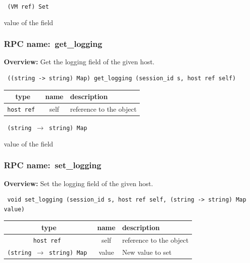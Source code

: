 \vspace{0.3cm}

{\tt 
(VM ref) Set
}


value of the field
\vspace{0.3cm}
\vspace{0.3cm}
\vspace{0.3cm}
\subsubsection{RPC name:~get\_logging}

{\bf Overview:} 
Get the logging field of the given host.

\begin{verbatim} ((string -> string) Map) get_logging (session_id s, host ref self)\end{verbatim}



 
\vspace{0.3cm}
\begin{tabular}{|c|c|p{7cm}|}
 \hline
{\bf type} & {\bf name} & {\bf description} \\ \hline
{\tt host ref } & self & reference to the object \\ \hline 

\end{tabular}

\vspace{0.3cm}

{\tt 
(string $\rightarrow$ string) Map
}


value of the field
\vspace{0.3cm}
\vspace{0.3cm}
\vspace{0.3cm}
\subsubsection{RPC name:~set\_logging}

{\bf Overview:} 
Set the logging field of the given host.

\begin{verbatim} void set_logging (session_id s, host ref self, (string -> string) Map value)\end{verbatim}



 
\vspace{0.3cm}
\begin{tabular}{|c|c|p{7cm}|}
 \hline
{\bf type} & {\bf name} & {\bf description} \\ \hline
{\tt host ref } & self & reference to the object \\ \hline 

{\tt (string $\rightarrow$ string) Map } & value & New value to set \\ \hline 

\end{tabular}

